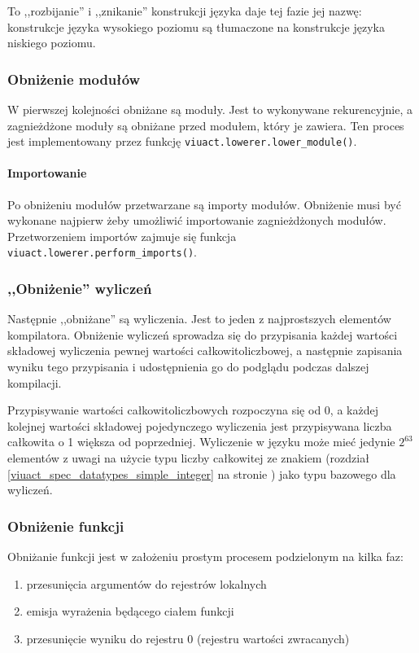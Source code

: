 To ,,rozbijanie'' i ,,znikanie'' konstrukcji języka daje tej fazie jej nazwę:
konstrukcje języka wysokiego poziomu są tłumaczone na konstrukcje języka
niskiego poziomu.

\subsubsection{Obniżenie modułów}

W pierwszej kolejności obniżane są moduły. Jest to wykonywane rekurencyjnie,
a zagnieżdżone moduły są obniżane przed modułem, który je zawiera. Ten proces
jest implementowany przez funkcję \texttt{viuact.lowerer.lower\_module()}.

\paragraph*{Importowanie} Po obniżeniu modułów przetwarzane są importy
modułów. Obniżenie musi być wykonane najpierw żeby umożliwić importowanie
zagnieżdżonych modułów. Przetworzeniem importów zajmuje się funkcja
\texttt{viuact.lowerer.perform\_imports()}.

\subsubsection{,,Obniżenie'' wyliczeń}

Następnie ,,obniżane'' są wyliczenia. Jest to jeden z najprostszych elementów
kompilatora. Obniżenie wyliczeń sprowadza się do przypisania każdej wartości
składowej wyliczenia pewnej wartości całkowitoliczbowej, a następnie zapisania
wyniku tego przypisania i udostępnienia go do podglądu podczas dalszej
kompilacji.

Przypisywanie wartości całkowitoliczbowych rozpoczyna się od 0, a każdej
kolejnej wartości składowej pojedynczego wyliczenia jest przypisywana liczba
całkowita o 1 większa od poprzedniej.
Wyliczenie w języku \ViuAct\phantom{} może mieć jedynie $2^{63}$ elementów z
uwagi na użycie typu liczby całkowitej ze znakiem (rozdział \ref{viuact_spec_datatypes_simple_integer}
na stronie \pageref{viuact_spec_datatypes_simple_integer}) jako typu bazowego
dla wyliczeń.

\subsubsection{Obniżenie funkcji} Obniżanie funkcji jest w założeniu prostym
procesem podzielonym na kilka faz:

\begin{enumerate}
    \item przesunięcia argumentów do rejestrów lokalnych
    \item emisja wyrażenia będącego ciałem funkcji
    \item przesunięcie wyniku do rejestru 0 (rejestru wartości zwracanych)
\end{enumerate}

